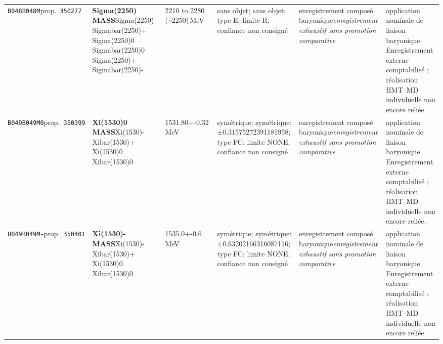 \begin{landscape}
\begin{longtable}{L{1.85cm}L{4.45cm}L{2.35cm}L{4.05cm}L{3.35cm}L{7.15cm}}
\texttt{B048}\newline \texttt{B048M}\newline prop.\ \texttt{350277} & \textbf{Sigma(2250) MASS}\newline Sigma(2250)- \textbar{}\allowbreak{} Sigmabar(2250)+ \textbar{}\allowbreak{} Sigma(2250)0 \textbar{}\allowbreak{} Sigmabar(2250)0 \textbar{}\allowbreak{} Sigma(2250)+ \textbar{}\allowbreak{} Sigmabar(2250)- & 2210 to 2280 (\textasciitilde{}2250)\,MeV & sans objet; sans objet; type E; limite R; confiance non consigné & enregistrement composé baryonique\newline \emph{enregistrement exhaustif sans promotion comparative} & application nominale de liaison baryonique. Enregistrement externe comptabilisé ; réalisation HMT--MD individuelle non encore reliée. \\
\texttt{B049}\newline \texttt{B049M0}\newline prop.\ \texttt{350399} & \textbf{Xi(1530)0 MASS}\newline Xi(1530)- \textbar{}\allowbreak{} Xibar(1530)+ \textbar{}\allowbreak{} Xi(1530)0 \textbar{}\allowbreak{} Xibar(1530)0 & 1531.80+-0.32\,MeV & symétrique; symétrique: ±0.31575272391181958; type FC; limite NONE; confiance non consigné & enregistrement composé baryonique\newline \emph{enregistrement exhaustif sans promotion comparative} & application nominale de liaison baryonique. Enregistrement externe comptabilisé ; réalisation HMT--MD individuelle non encore reliée. \\
\texttt{B049}\newline \texttt{B049M-}\newline prop.\ \texttt{350401} & \textbf{Xi(1530)- MASS}\newline Xi(1530)- \textbar{}\allowbreak{} Xibar(1530)+ \textbar{}\allowbreak{} Xi(1530)0 \textbar{}\allowbreak{} Xibar(1530)0 & 1535.0+-0.6\,MeV & symétrique; symétrique: ±0.63202166316087116; type FC; limite NONE; confiance non consigné & enregistrement composé baryonique\newline \emph{enregistrement exhaustif sans promotion comparative} & application nominale de liaison baryonique. Enregistrement externe comptabilisé ; réalisation HMT--MD individuelle non encore reliée. \\

\end{longtable}
\end{landscape}
